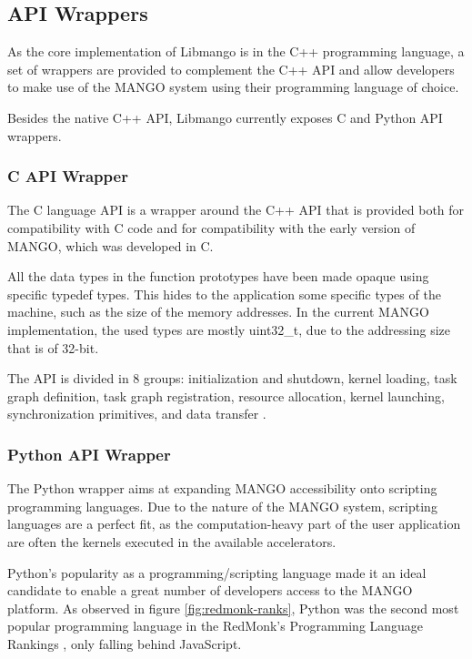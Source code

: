 \subsection{API Wrappers}
As the core implementation of Libmango is in the C++ programming language, a set of wrappers are provided to complement the C++ API and allow developers to make use of the MANGO system using their programming language of choice.

Besides the native C++ API, Libmango currently exposes C and Python API wrappers.

\subsubsection{C API Wrapper}

The C language API is a wrapper around the C++ API that is provided both for compatibility with C code and for compatibility with the early version of MANGO, which was developed in C.

All the data types in the function prototypes have been made opaque using specific typedef types. This hides to the application some specific types of the machine, such as the size of the memory addresses. In the current MANGO implementation, the used types are mostly uint32\_t, due to the addressing size that is of 32-bit.

The API is divided in 8 groups: initialization and shutdown, kernel loading, task graph definition, task graph registration, resource allocation, kernel launching, synchronization primitives, and data transfer \cite{mango_exploring_manycore_architectures}.

\subsubsection{Python API Wrapper}

The Python wrapper aims at expanding MANGO accessibility onto scripting programming languages. Due to the nature of the MANGO system, scripting languages are a perfect fit, as the computation-heavy part of the user application are often the kernels executed in the available accelerators.

Python's popularity as a programming/scripting language made it an ideal candidate to enable a great number of developers access to the MANGO platform. As observed in figure \ref{fig:redmonk-ranks}, Python was the second most popular programming language in the RedMonk's Programming Language Rankings \cite{redmonks_rankings}, only falling behind JavaScript.

